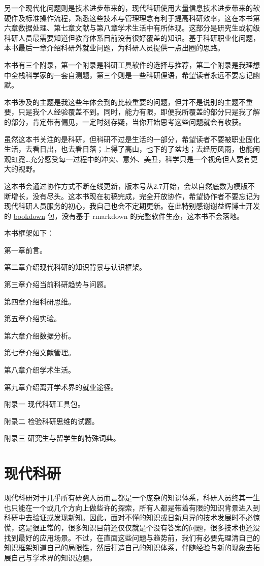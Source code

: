 \documentclass[]{tufte-book}
\begin{document}
另一个现代化问题则是技术进步带来的，现代科研使用大量信息技术进步带来的软硬件及标准操作流程，熟悉这些技术与管理理念有利于提高科研效率，这在本书第六章数据处理、第七章文献与第八章学术生活中有所体现。这部分是研究生或初级科研人员最需要知道但教育体系目前没有很好覆盖的知识。基于科研职业化问题，本书最后一章介绍科研外就业问题，为科研人员提供一点出圈的思路。

本书有三个附录，第一个附录是科研工具软件的选择与推荐，第二个附录是我理想中全栈科学家的一套自测题，第三个则是一些科研俚语，希望读者永远不要忘记幽默。

本书涉及的主题是我这些年体会到的比较重要的问题，但并不是说别的主题不重要，只是我个人经验覆盖不到。同时，能力有限，即便我所覆盖的部分只是我了解的部分，肯定带有偏见，一定时刻存疑，当你开始思考这些问题就会有收获。

虽然这本书关注的是科研，但科研不过是生活的一部分，希望读者不要被职业固化生活，去看日出，也去看日落；上得了高山，也下的了盆地；去经历风雨，也能闲观虹霓\ldots 充分感受每一过程中的冲突、意外、美丑，科学只是一个视角但人要有更大的视野。

这本书会通过协作方式不断在线更新，版本号从2.7开始，会以自然底数为模版不断增长，没有尽头。这本书现在初稿完成，完全开放协作，希望协作者不要忘记为现代科研人员服务的初心，我自己也会不定期更新。在此特别感谢谢益辉博士开发的 \href{https://bookdown.org/yihui/bookdown/}{bookdown} 包，没有基于 rmarkdown 的完整软件生态，这本书不会落地。

本书框架如下：

第一章前言。

第二章介绍现代科研的知识背景与认识框架。

第三章介绍当前科研趋势与问题。

第四章介绍科研思维。

第五章介绍实验。

第六章介绍数据分析。

第七章介绍文献管理。

第八章介绍学术生活。

第九章介绍离开学术界的就业途径。

附录一 现代科研工具包。

附录二 检验科研思维的试题。

附录三 研究生与留学生的特殊词典。

\hypertarget{intro}{%
\chapter{现代科研}\label{intro}}

现代科研对于几乎所有研究人员而言都是一个庞杂的知识体系，科研人员终其一生也只能在一个或几个方向上做些许的探索，所有人都是带着有限的知识背景进入到科研中去验证或发现新知。因此，面对不懂的知识或日新月异的技术发展时不必惊慌，这是很正常的，很多知识目前还仅仅就是个没有答案的问题，很多技术也还没找到最好的应用场景。不过，在直面这些问题与趋势前，我们有必要先理清自己的知识框架知道自己的局限性，然后打造自己的知识体系，伴随经验与新的现象去拓展自己与学术界的知识边疆。
\end{document}
